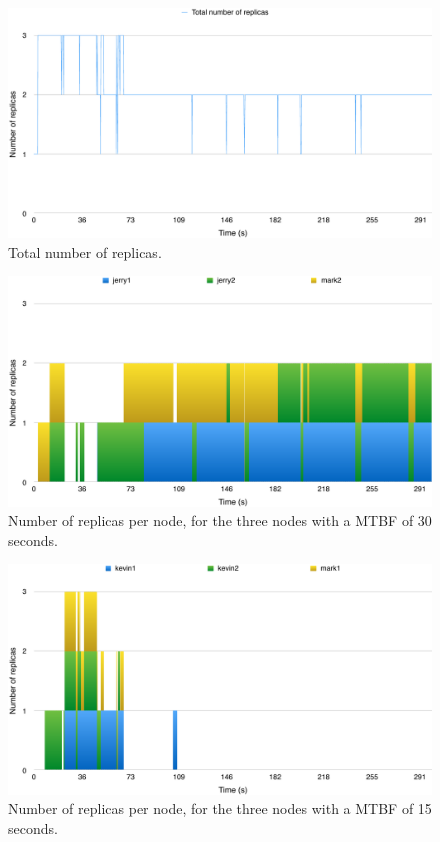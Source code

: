\documentclass{cslthse-msc}
\begin{document}
\begin{figure}[!hbt]
\centering
\includegraphics[scale=0.5]{images/results/optimal_replicas/total.pdf}
\caption{Total number of replicas.} \label{fig:exp_opt_replicas_total}
\end{figure}

\begin{figure}[!hbt]
\centering
\includegraphics[scale=0.5]{images/results/optimal_replicas/MTBF_30.pdf}
\caption{Number of replicas per node, for the three nodes with a MTBF of 30 seconds.} \label{fig:exp_opt_replicas_MTBF_30}
\end{figure}

\begin{figure}[!hbt]
\centering
\includegraphics[scale=0.5]{images/results/optimal_replicas/MTBF_15.pdf}
\caption{Number of replicas per node, for the three nodes with a MTBF of 15 seconds.} \label{fig:exp_opt_replicas_MTBF_15}
\end{figure}
\end{document}
